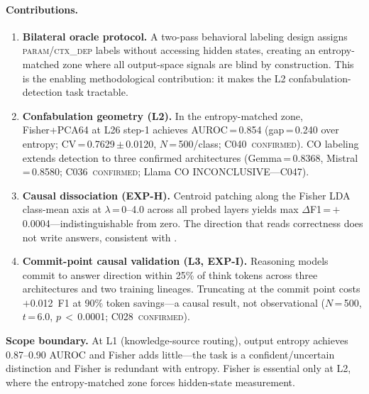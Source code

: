 \documentclass[11pt]{article}
\begin{document}
\paragraph{Contributions.}
\begin{enumerate}[leftmargin=2em, label=\arabic*.]
\item \textbf{Bilateral oracle protocol.}
  A two-pass behavioral labeling design assigns \textsc{param}/\textsc{ctx\_dep}
  labels without accessing hidden states, creating an entropy-matched zone where
  all output-space signals are blind by construction. This is the enabling
  methodological contribution: it makes the L2 confabulation-detection task tractable.

\item \textbf{Confabulation geometry (L2).}
  In the entropy-matched zone, Fisher+PCA64 at L26 step-1 achieves AUROC\,=\,0.854
  (gap\,=\,0.240 over entropy; CV\,=\,0.7629\,$\pm$\,0.0120, $N$\,=\,500/class;
  C040~\textsc{confirmed}). CO labeling extends detection to three confirmed
  architectures (Gemma\,=\,0.8368, Mistral\,=\,0.8580; C036~\textsc{confirmed};
  Llama CO INCONCLUSIVE---C047).

\item \textbf{Causal dissociation (EXP-H).}
  Centroid patching along the Fisher LDA class-mean axis at $\lambda$\,=\,0--4.0
  across all probed layers yields max $\Delta$F1\,=\,$+$0.0004---indistinguishable
  from zero. The direction that reads correctness does not write answers,
  consistent with \citet{cox2026decoding}.

\item \textbf{Commit-point causal validation (L3, EXP-I).}
  Reasoning models commit to answer direction within 25\% of think tokens across
  three architectures and two training lineages. Truncating at the commit point
  costs $+$0.012~F1 at 90\% token savings---a causal result, not observational
  ($N$\,=\,500, $t$\,=\,6.0, $p$\,$<$\,0.0001; C028~\textsc{confirmed}).
\end{enumerate}

\noindent\textbf{Scope boundary.}
At L1 (knowledge-source routing), output entropy achieves 0.87--0.90 AUROC and
Fisher adds little---the task is a confident/uncertain distinction and Fisher is
redundant with entropy. Fisher is essential only at L2, where the entropy-matched
zone forces hidden-state measurement.
\end{document}
